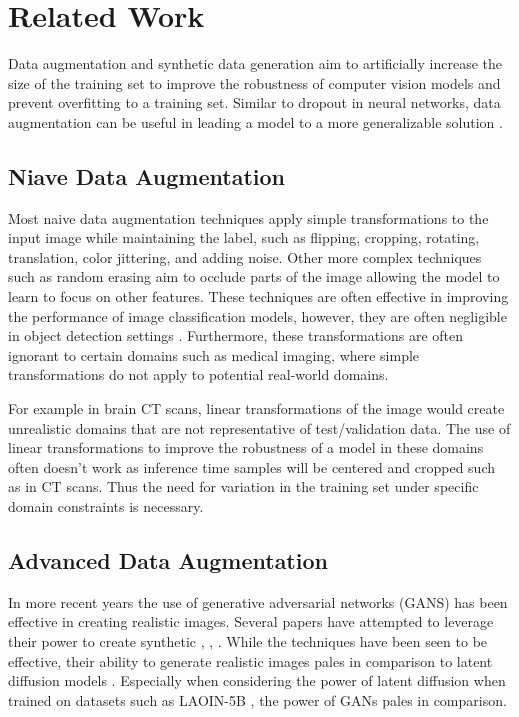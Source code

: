 \documentclass{article}
\begin{document}
\section{Related Work}

Data augmentation and synthetic data generation aim to artificially increase the size of the training set to improve the robustness
of computer vision models and prevent overfitting to a training set. Similar to dropout in neural networks, data augmentation can be
useful in leading a model to a more generalizable solution \cite{1708.04896}.

\subsection{Niave Data Augmentation}

Most naive data augmentation techniques apply simple transformations to the input image while maintaining the label, such as flipping,
cropping, rotating, translation, color jittering, and adding noise. Other more complex techniques such as random erasing \cite{1708.04896} aim to occlude
parts of the image allowing the model to learn to focus on other features. These techniques are often effective in improving the performance
of image classification models, however, they are often negligible in object detection settings \cite{2204.08610}. Furthermore, these transformations 
are often ignorant to certain domains such as medical imaging, where simple transformations do not apply to potential real-world domains.

For example in brain CT scans, linear transformations of the image would create unrealistic domains that are not representative of test/validation data. 
The use of linear transformations to improve the robustness of a model in these domains often doesn't work as inference time samples will be centered 
and cropped such as in CT scans. Thus the need for variation in the training set under specific domain constraints is necessary. 

\subsection{Advanced Data Augmentation}

In more recent years the use of generative adversarial networks (GANS) \cite{1406.2661} has been effective in creating realistic images. Several papers
have attempted to leverage their power to create synthetic \cite{1911.02888}, \cite{2104.06490}, \cite{2106.05258}. While the techniques have been seen to be effective,
their ability to generate realistic images pales in comparison to latent diffusion models \cite{2112.10752}. Especially when considering the power of latent 
diffusion when trained on datasets such as LAOIN-5B \cite{2210.08402}, the power of GANs pales in comparison.
\end{document}

